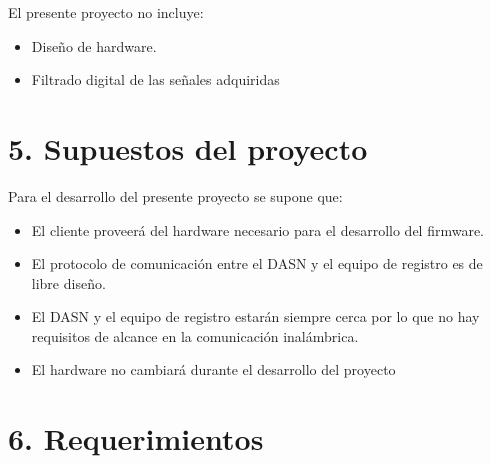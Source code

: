 \documentclass[
11pt, %
codirector, %
]{charter}
\begin{document}
El presente proyecto no incluye:
\begin{itemize}
	\item Diseño de hardware.
	\item Filtrado digital de las señales adquiridas
\end{itemize}

%
%
%
%


\section{5. Supuestos del proyecto}
\label{sec:supuestos}

Para el desarrollo del presente proyecto se supone que:
\begin{itemize}
	\item El cliente proveerá del hardware necesario para el desarrollo del firmware.
	\item El protocolo de comunicación entre el DASN y el equipo de registro es de libre diseño.
	\item El DASN y el equipo de registro estarán siempre cerca por lo que no hay requisitos de alcance en la comunicación inalámbrica.
	\item El hardware no cambiará durante el desarrollo del proyecto
\end{itemize}

%
%

\section{6. Requerimientos}
\label{sec:requerimientos}
\end{document}

